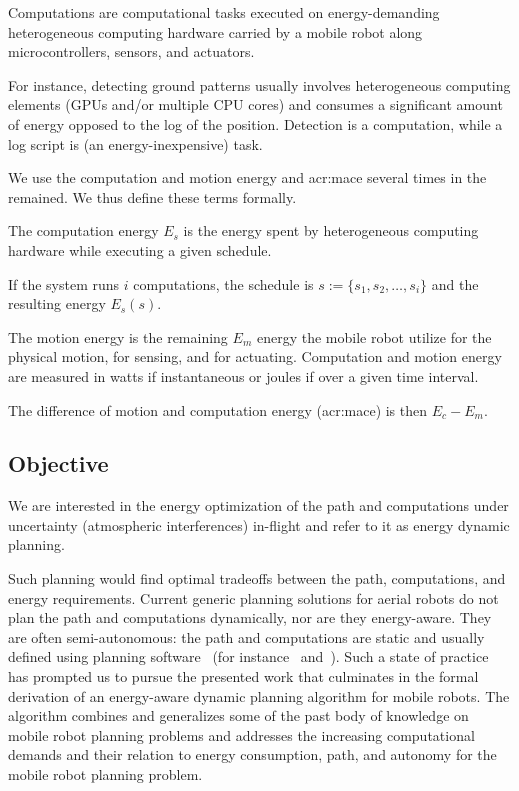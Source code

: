 \begin{highlight}
  \begin{defn}[Computations]
    Computations are computational tasks executed on energy-demanding heterogeneous computing hardware carried by a mobile robot along microcontrollers, sensors, and actuators.
  \end{defn}
\end{highlight}

For instance, detecting ground patterns usually involves heterogeneous computing elements (GPUs and/or multiple CPU cores) and consumes a significant amount of energy opposed to the log of the position. Detection is a computation, while a log script is (an energy-inexpensive) task.

We use the computation and motion energy and \Gls{acr:mace} several times in the remained. We thus define these terms formally.

\begin{highlight}
\begin{defn}
  The computation energy $E_s$ is the energy spent by heterogeneous computing hardware while executing a given schedule. 
  
  If the system runs $i$ computations, the schedule is $s:=\{s_1,s_2,\dots,s_i\}$ and the resulting energy $E_s(s)$.
  
  The motion energy is the remaining $E_m$ energy the mobile robot utilize for the physical motion, for sensing, and for actuating. Computation and motion energy are measured in watts if instantaneous or joules if over a given time interval.
  
  The difference of motion and computation energy (\Gls{acr:mace}) is then $E_c-E_m$.
\end{defn}
\end{highlight}

\subsection{Objective}

We are interested in the energy optimization of the path and computations under uncertainty (atmospheric interferences) in-flight and refer to it as energy dynamic planning.

Such planning would find optimal tradeoffs between the path, computations, and energy requirements. Current generic planning solutions for aerial robots do not plan the path and computations dynamically, nor are they energy-aware. They are often semi-autonomous: the path and computations are static and usually defined using planning software~\citep{daponte2019review} (for instance~\citep{papa} and~\citep{px4}). Such a state of practice has prompted us to pursue the presented work that culminates in the formal derivation of an energy-aware dynamic planning algorithm for mobile robots. The algorithm combines and generalizes some of the past body of knowledge on mobile robot planning problems and addresses the increasing computational demands and their relation to energy consumption, path, and autonomy for the mobile robot planning problem.

